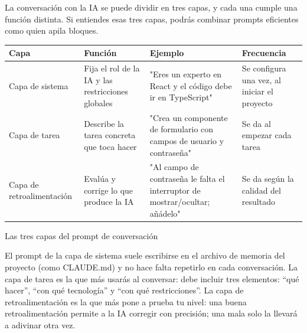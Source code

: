 


La conversación con la IA se puede dividir en tres capas, y cada una cumple una función distinta. Si entiendes esas tres capas, podrás combinar prompts eficientes como quien apila bloques.

\begin{center}
\begin{tabularx}{\linewidth}{|X|X|X|X|}
\hline
\textbf{Capa} & \textbf{Función} & \textbf{Ejemplo} & \textbf{Frecuencia} \tabularnewline
\hline
Capa de sistema & Fija el rol de la IA y las restricciones globales & "Eres un experto en React y el código debe ir en TypeScript" & Se configura una vez, al iniciar el proyecto \tabularnewline
Capa de tarea & Describe la tarea concreta que toca hacer & "Crea un componente de formulario con campos de usuario y contraseña" & Se da al empezar cada tarea \tabularnewline
Capa de retroalimentación & Evalúa y corrige lo que produce la IA & "Al campo de contraseña le falta el interruptor de mostrar/ocultar; añádelo" & Se da según la calidad del resultado \tabularnewline
\hline
\end{tabularx}
\end{center}

\begin{center}\small\color{gray}Las tres capas del prompt de conversación\end{center}

El prompt de la capa de sistema suele escribirse en el archivo de memoria del proyecto (como CLAUDE.md) y no hace falta repetirlo en cada conversación. La capa de tarea es la que más usarás al conversar: debe incluir tres elementos: “qué hacer”, “con qué tecnología” y “con qué restricciones”. La capa de retroalimentación es la que más pone a prueba tu nivel: una buena retroalimentación permite a la IA corregir con precisión; una mala solo la llevará a adivinar otra vez.

